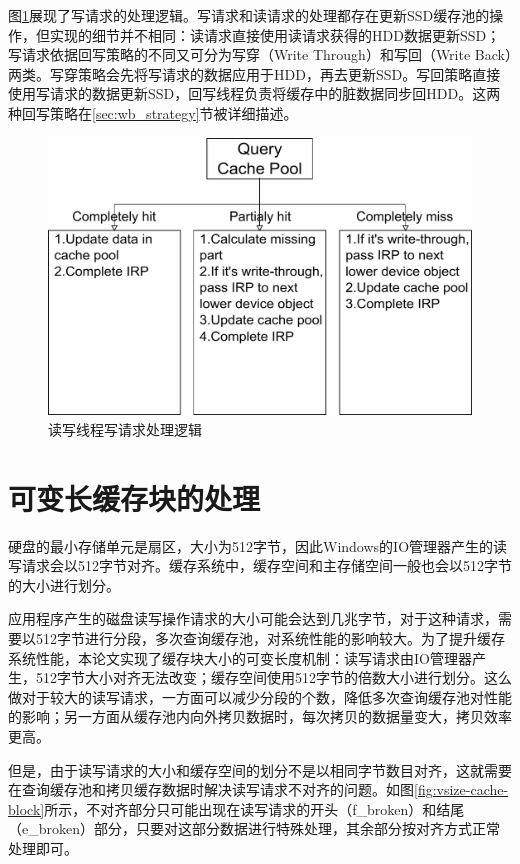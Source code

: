 图\ref{fig:df-proc-write}展现了写请求的处理逻辑。写请求和读请求的处理都存在更新SSD缓存池的操作，但实现的细节并不相同：读请求直接使用读请求获得的HDD数据更新SSD；写请求依据回写策略的不同又可分为写穿（Write Through）和写回（Write Back）两类。写穿策略会先将写请求的数据应用于HDD，再去更新SSD。写回策略直接使用写请求的数据更新SSD，回写线程负责将缓存中的脏数据同步回HDD。这两种回写策略在\ref{sec:wb_strategy}节被详细描述。

\begin{figure}[H]
\centering
\includegraphics[width=0.75\linewidth]{./graph/df-proc-write}
\caption{读写线程写请求处理逻辑}
\label{fig:df-proc-write}
\end{figure}


\section{可变长缓存块的处理}

硬盘的最小存储单元是扇区，大小为512字节，因此Windows的IO管理器产生的读写请求会以512字节对齐。缓存系统中，缓存空间和主存储空间一般也会以512字节的大小进行划分。

应用程序产生的磁盘读写操作请求的大小可能会达到几兆字节，对于这种请求，需要以512字节进行分段，多次查询缓存池，对系统性能的影响较大。为了提升缓存系统性能，本论文实现了缓存块大小的可变长度机制：读写请求由IO管理器产生，512字节大小对齐无法改变；缓存空间使用512字节的倍数大小进行划分。这么做对于较大的读写请求，一方面可以减少分段的个数，降低多次查询缓存池对性能的影响；另一方面从缓存池内向外拷贝数据时，每次拷贝的数据量变大，拷贝效率更高。

但是，由于读写请求的大小和缓存空间的划分不是以相同字节数目对齐，这就需要在查询缓存池和拷贝缓存数据时解决读写请求不对齐的问题。如图\ref{fig:vsize-cache-block}所示，不对齐部分只可能出现在读写请求的开头（f\_broken）和结尾（e\_broken）部分，只要对这部分数据进行特殊处理，其余部分按对齐方式正常处理即可。

